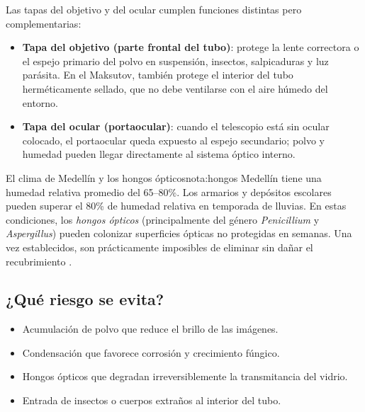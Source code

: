 \documentclass[12pt,oneside]{book}
\begin{document}
Las tapas del objetivo y del ocular cumplen funciones distintas pero complementarias:

\begin{itemize}[leftmargin=1.5em]
    \item \textbf{Tapa del objetivo (parte frontal del tubo)}: protege la lente correctora
          o el espejo primario del polvo en suspensión, insectos, salpicaduras y luz
          parásita. En el Maksutov, también protege el interior del tubo herméticamente
          sellado, que no debe ventilarse con el aire húmedo del entorno.
    \item \textbf{Tapa del ocular (portaocular)}: cuando el telescopio está sin ocular
          colocado, el portaocular queda expuesto al espejo secundario; polvo y humedad
          pueden llegar directamente al sistema óptico interno.
\end{itemize}

\begin{nota}{El clima de Medellín y los hongos ópticos}{nota:hongos}
    Medellín tiene una humedad relativa promedio del 65–80\%. Los armarios y depósitos
    escolares pueden superar el 80\% de humedad relativa en temporada de lluvias.
    En estas condiciones, los \emph{hongos ópticos} (principalmente del género
    \textit{Penicillium} y \textit{Aspergillus}) pueden colonizar superficies
    ópticas no protegidas en semanas. Una vez establecidos, son prácticamente
    imposibles de eliminar sin dañar el recubrimiento \cite{rutten1988}.
\end{nota}

\subsection{¿Qué riesgo se evita?}

\begin{itemize}[leftmargin=1.5em]
    \item Acumulación de polvo que reduce el brillo de las imágenes.
    \item Condensación que favorece corrosión y crecimiento fúngico.
    \item Hongos ópticos que degradan irreversiblemente la transmitancia del vidrio.
    \item Entrada de insectos o cuerpos extraños al interior del tubo.
\end{itemize}
\end{document}
